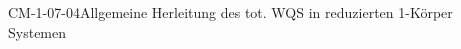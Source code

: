 
\begin{REM}{CM-1-07-04}{Allgemeine Herleitung des tot. WQS in reduzierten 1-Körper Systemen}
\end{REM}
